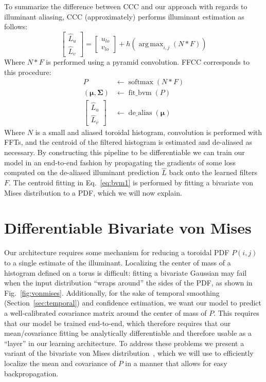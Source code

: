 \documentclass[10pt,twocolumn,letterpaper]{article}
\newcommand{\binwidth}{h}
\DeclareMathOperator*{\argmax}{arg\,max}
\begin{document}
To summarize the difference between CCC \cite{BarronICCV2015} and our approach
with regards to illuminant aliasing, CCC (approximately) performs illuminant
estimation as follows:
\begin{equation}
\begin{bmatrix} \hat{L}_u \\ \hat{L}_v \end{bmatrix} = \begin{bmatrix}u_\mathit{lo} \\ v_\mathit{lo}\end{bmatrix} + \binwidth \left( \argmax_{i, j}\left( N * F \right) \right)
\end{equation}
Where $N * F$ is performed using a pyramid convolution.
FFCC corresponds to this procedure:
\begin{align}
P &\leftarrow \operatorname{softmax} \left( N * F \right) \label{eq:softmax1} \\
(\boldsymbol{\mu}, \boldsymbol{\Sigma}) &\leftarrow \operatorname{fit\_bvm}(P)  \label{eq:bvm1} \\
\begin{bmatrix} \hat{L}_u \\ \hat{L}_v \end{bmatrix} &\leftarrow \operatorname{de\_alias}(\boldsymbol{\mu}) \label{eq:dealias}
\end{align}
Where $N$ is a small and aliased toroidal histogram, convolution is performed with
FFTs, and the centroid of the filtered histogram is estimated and
de-aliased as necessary.
By constructing this pipeline to be differentiable we can train our model in an end-to-end fashion by propagating the gradients of some loss computed on the
de-aliased illuminant prediction $\hat{L}$ back onto the learned filters $F$.
The centroid fitting in Eq.~\ref{eq:bvm1} is performed by fitting
a bivariate von Mises distribution to a PDF, which we will now explain.

\section{Differentiable Bivariate von Mises}
\label{sec:bvm}

Our architecture requires some mechanism for reducing a
toroidal PDF $P(i,j)$ to a single estimate of the illuminant.
Localizing the center of mass of a histogram defined on a torus is difficult:
fitting a bivariate Gaussian may
fail when the input distribution ``wraps around'' the sides of the PDF, as
shown in Fig.~\ref{fig:vonmises}.
Additionally, for the sake of temporal smoothing (Section~\ref{sec:temporal})
and confidence estimation,
we want our model to predict a well-calibrated covariance matrix around the
center of mass of $P$.
This requires that our model be trained end-to-end,
which therefore requires that our mean/covariance fitting be analytically
differentiable and therefore usable as a ``layer'' in our learning
architecture.
To address these problems we present a variant of the bivariate von Mises
distribution~\cite{Mardia1975}, which we will use to efficiently localize
the mean and covariance of $P$ in a manner that allows for easy backpropagation.
\end{document}

